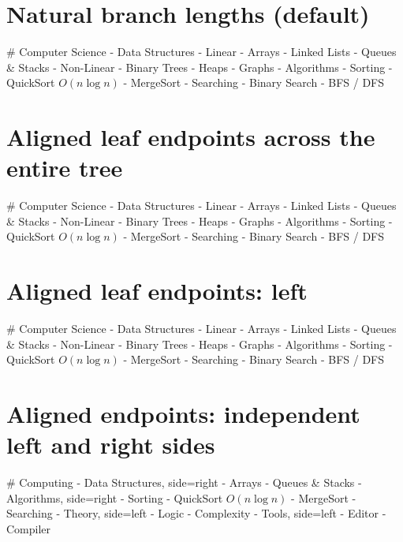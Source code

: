 \documentclass{article}
\begin{document}
\section*{Natural branch lengths (default)}
\begin{mindchart}[layout=right, scale=0.78]
# Computer Science
  - Data Structures
    - Linear
      - Arrays
      - Linked Lists
      - Queues \& Stacks
    - Non-Linear
      - Binary Trees
      - Heaps
      - Graphs
  - Algorithms
    - Sorting
      - QuickSort $O(n\log n)$
      - MergeSort
    - Searching
      - Binary Search
      - BFS / DFS
\end{mindchart}

\newpage
\section*{Aligned leaf endpoints across the entire tree}
\begin{mindchart}[layout=right, equal_branch_length=true, scale=0.78]
# Computer Science
  - Data Structures
    - Linear
      - Arrays
      - Linked Lists
      - Queues \& Stacks
    - Non-Linear
      - Binary Trees
      - Heaps
      - Graphs
  - Algorithms
    - Sorting
      - QuickSort $O(n\log n)$
      - MergeSort
    - Searching
      - Binary Search
      - BFS / DFS
\end{mindchart}

\newpage
\section*{Aligned leaf endpoints: left}
\begin{mindchart}[layout=left, equal_branch_length=true, scale=0.78]
# Computer Science
  - Data Structures
    - Linear
      - Arrays
      - Linked Lists
      - Queues \& Stacks
    - Non-Linear
      - Binary Trees
      - Heaps
      - Graphs
  - Algorithms
    - Sorting
      - QuickSort $O(n\log n)$
      - MergeSort
    - Searching
      - Binary Search
      - BFS / DFS
\end{mindchart}

\newpage
\section*{Aligned endpoints: independent left and right sides}
\begin{mindchart}[layout=balanced, style=underline, equal_branch_length=true, scale=0.72]
# Computing
  - Data Structures, side=right
    - Arrays
    - Queues \& Stacks
  - Algorithms, side=right
    - Sorting
      - QuickSort $O(n\log n)$
      - MergeSort
    - Searching
  - Theory, side=left
    - Logic
    - Complexity
  - Tools, side=left
    - Editor
    - Compiler
\end{mindchart}
\newpage
\end{document}
